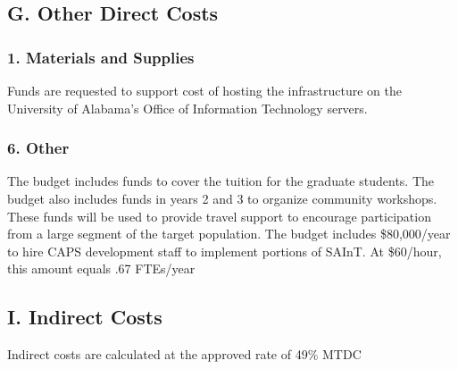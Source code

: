 \subsection*{G. Other Direct Costs}

\subsubsection*{1. Materials and Supplies}

Funds are requested to support cost of hosting the infrastructure on the University of Alabama's Office of Information Technology servers.

\subsubsection*{6. Other}

The budget includes funds to cover the tuition for the graduate students.
The budget also includes funds in years 2 and 3 to organize community workshops. These funds will be used to provide travel support to encourage participation from a large segment of the target population.
The budget includes \$80,000/year to hire CAPS development staff to implement portions of SAInT. At \$60/hour, this amount equals .67 FTEs/year

\subsection*{I. Indirect Costs}

Indirect costs are calculated at the approved rate of 49\% MTDC


